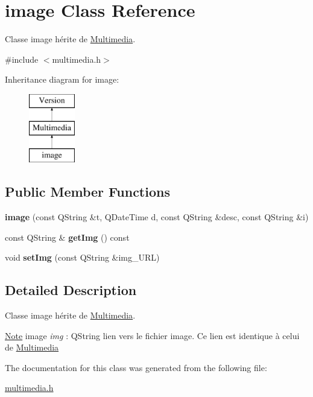 \hypertarget{classimage}{}\section{image Class Reference}
\label{classimage}


Classe image hérite de \hyperlink{class_multimedia}{Multimedia}.  




{\ttfamily \#include $<$multimedia.\+h$>$}

Inheritance diagram for image\+:\begin{figure}[H]
\begin{center}
\leavevmode
\includegraphics[height=3.000000cm]{classimage}
\end{center}
\end{figure}
\subsection*{Public Member Functions}
\begin{DoxyCompactItemize}
\item 
\mbox{\label{classimage_abea77c75bedbc04610dbe4edcfc83b8e}} 
{\bfseries image} (const Q\+String \&t, Q\+Date\+Time d, const Q\+String \&desc, const Q\+String \&i)
\item 
\mbox{\label{classimage_a42db73028875ee5097f32b9e0983cf43}} 
const Q\+String \& {\bfseries get\+Img} () const
\item 
\mbox{\label{classimage_a9c4f017fd62bf11a8cfdd56ea4f71f0f}} 
void {\bfseries set\+Img} (const Q\+String \&img\+\_\+\+U\+RL)
\end{DoxyCompactItemize}


\subsection{Detailed Description}
Classe image hérite de \hyperlink{class_multimedia}{Multimedia}. 

\hyperlink{class_note}{Note} image {\itshape img} \+: Q\+String lien vers le fichier image. Ce lien est identique à celui de \hyperlink{class_multimedia}{Multimedia} 

The documentation for this class was generated from the following file\+:\begin{DoxyCompactItemize}
\item 
\hyperlink{multimedia_8h}{multimedia.\+h}\end{DoxyCompactItemize}

